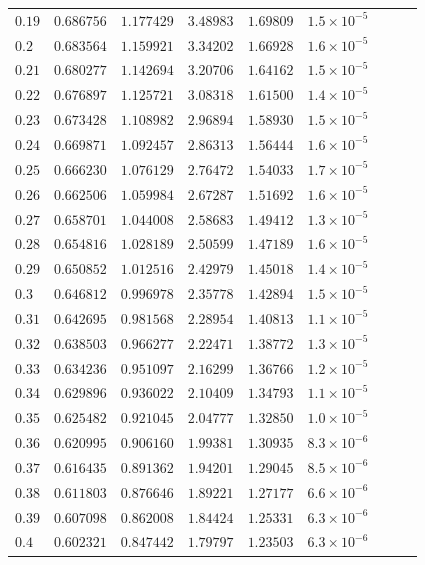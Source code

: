 \documentclass[12pt]{extarticle}
\theoremstyle{plain}
\theoremstyle{remark}
\begin{document}
\begin{longtable}{lcccccccc}
$0.19$ & $0.686756$ & $1.177429$ & $3.48983$ & $1.69809$ & $1.5\times10^{-5}$ \\
$0.2$ & $0.683564$ & $1.159921$ & $3.34202$ & $1.66928$ & $1.6\times10^{-5}$ \\
$0.21$ & $0.680277$ & $1.142694$ & $3.20706$ & $1.64162$ & $1.5\times10^{-5}$ \\
$0.22$ & $0.676897$ & $1.125721$ & $3.08318$ & $1.61500$ & $1.4\times10^{-5}$ \\
$0.23$ & $0.673428$ & $1.108982$ & $2.96894$ & $1.58930$ & $1.5\times10^{-5}$ \\
$0.24$ & $0.669871$ & $1.092457$ & $2.86313$ & $1.56444$ & $1.6\times10^{-5}$ \\
$0.25$ & $0.666230$ & $1.076129$ & $2.76472$ & $1.54033$ & $1.7\times10^{-5}$ \\
$0.26$ & $0.662506$ & $1.059984$ & $2.67287$ & $1.51692$ & $1.6\times10^{-5}$ \\
$0.27$ & $0.658701$ & $1.044008$ & $2.58683$ & $1.49412$ & $1.3\times10^{-5}$ \\
$0.28$ & $0.654816$ & $1.028189$ & $2.50599$ & $1.47189$ & $1.6\times10^{-5}$ \\
$0.29$ & $0.650852$ & $1.012516$ & $2.42979$ & $1.45018$ & $1.4\times10^{-5}$ \\
$0.3$ & $0.646812$ & $0.996978$ & $2.35778$ & $1.42894$ & $1.5\times10^{-5}$ \\
$0.31$ & $0.642695$ & $0.981568$ & $2.28954$ & $1.40813$ & $1.1\times10^{-5}$ \\
$0.32$ & $0.638503$ & $0.966277$ & $2.22471$ & $1.38772$ & $1.3\times10^{-5}$ \\
$0.33$ & $0.634236$ & $0.951097$ & $2.16299$ & $1.36766$ & $1.2\times10^{-5}$ \\
$0.34$ & $0.629896$ & $0.936022$ & $2.10409$ & $1.34793$ & $1.1\times10^{-5}$ \\
$0.35$ & $0.625482$ & $0.921045$ & $2.04777$ & $1.32850$ & $1.0\times10^{-5}$ \\
$0.36$ & $0.620995$ & $0.906160$ & $1.99381$ & $1.30935$ & $8.3\times10^{-6}$ \\
$0.37$ & $0.616435$ & $0.891362$ & $1.94201$ & $1.29045$ & $8.5\times10^{-6}$ \\
$0.38$ & $0.611803$ & $0.876646$ & $1.89221$ & $1.27177$ & $6.6\times10^{-6}$ \\
$0.39$ & $0.607098$ & $0.862008$ & $1.84424$ & $1.25331$ & $6.3\times10^{-6}$ \\
$0.4$ & $0.602321$ & $0.847442$ & $1.79797$ & $1.23503$ & $6.3\times10^{-6}$ \\

\end{longtable}
\end{document}
